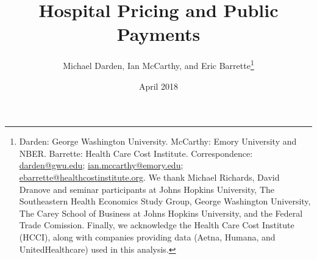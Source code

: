 \documentclass[12pt]{article}
\begin{document}
\title{Hospital Pricing and Public Payments}
\author{%
  Michael Darden, Ian McCarthy, and Eric Barrette\thanks{Darden: George Washington University. McCarthy: Emory University and NBER. Barrette: Health Care Cost Institute.  Correspondence: \href{mailto:darden@gwu.edu}{darden@gwu.edu}; \href{mailto:ian.mccarthy@emory.edu}{ian.mccarthy@emory.edu}; \href{mailto:ebarrette@healthcostinstitute.org}{ebarrette@healthcostinstitute.org}.  We thank Michael Richards, David Dranove and seminar participants at Johns Hopkins University, The Southeastern Health Economics Study Group, George Washington University, The Carey School of Business at Johns Hopkins University, and the Federal Trade Comission.  Finally, we acknowledge the Health Care Cost Institute (HCCI), along with companies providing data (Aetna, Humana, and UnitedHealthcare) used in this analysis.}
}
\date{April 2018}

\maketitle
\end{document}
